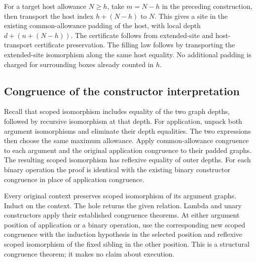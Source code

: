 


For a target host allowance $N\geq h$, take $m=N-h$ in the preceding
construction, then transport the host index $h+(N-h)$ to $N$. This gives a
site in the existing common-allowance padding of the host, with local depth
$d+(n+(N-h))$. The certificate follows from extended-site and host-transport
certificate preservation. The filling law follows by transporting the
extended-site isomorphism along the same host equality. No additional padding
is charged for surrounding boxes already counted in $h$.





\subsection{Congruence of the constructor interpretation}

Recall that scoped isomorphism includes equality of the two graph depths,
followed by recursive isomorphism at that depth. For application, unpack both
argument isomorphisms and eliminate their depth equalities. The two expressions
then choose the same maximum allowance. Apply common-allowance congruence to
each argument and the original application congruence to their padded graphs.
The resulting scoped isomorphism has reflexive equality of outer depths.
For each binary operation the proof is identical with the existing binary
constructor congruence in place of application congruence.




Every original context preserves scoped isomorphism of its argument graphs.
Induct on the context. The hole returns the given relation. Lambda and unary
constructors apply their established congruence theorems. At either argument
position of application or a binary operation, use the corresponding new
scoped congruence with the induction hypothesis in the selected position and
reflexive scoped isomorphism of the fixed sibling in the other position.
This is a structural congruence theorem; it makes no claim about execution.


